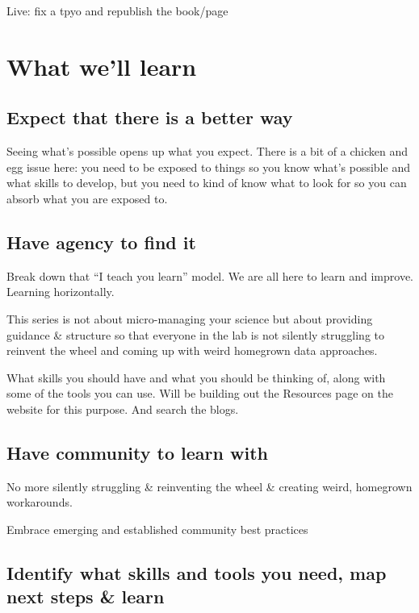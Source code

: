 \documentclass[
  letterpaper,
  DIV=11,
  numbers=noendperiod]{scrreprt}
\begin{document}
Live: fix a tpyo and republish the book/page

\hypertarget{what-well-learn}{%
\section{What we'll learn}\label{what-well-learn}}

\hypertarget{expect-that-there-is-a-better-way}{%
\subsection{Expect that there is a better
way}\label{expect-that-there-is-a-better-way}}

Seeing what's possible opens up what you expect. There is a bit of a
chicken and egg issue here: you need to be exposed to things so you know
what's possible and what skills to develop, but you need to kind of know
what to look for so you can absorb what you are exposed to.

\hypertarget{have-agency-to-find-it}{%
\subsection{Have agency to find it}\label{have-agency-to-find-it}}

Break down that ``I teach you learn'' model. We are all here to learn
and improve. Learning horizontally.

This series is not about micro-managing your science but about providing
guidance \& structure so that everyone in the lab is not silently
struggling to reinvent the wheel and coming up with weird homegrown data
approaches.

What skills you should have and what you should be thinking of, along
with some of the tools you can use. Will be building out the Resources
page on the website for this purpose. And search the blogs.

\hypertarget{have-community-to-learn-with}{%
\subsection{Have community to learn
with}\label{have-community-to-learn-with}}

No more silently struggling \& reinventing the wheel \& creating weird,
homegrown workarounds.

Embrace emerging and established community best practices

\hypertarget{identify-what-skills-and-tools-you-need-map-next-steps-learn}{%
\subsection{Identify what skills and tools you need, map next steps \&
learn}\label{identify-what-skills-and-tools-you-need-map-next-steps-learn}}
\end{document}
